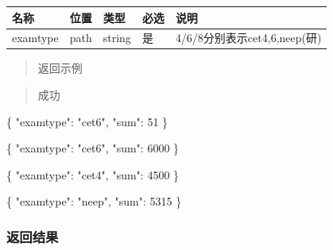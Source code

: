 \documentclass[
]{article}
\newenvironment{Shaded}{}{}
\newcommand{\DataTypeTok}[1]{\textcolor[rgb]{0.56,0.13,0.00}{#1}}
\newcommand{\DecValTok}[1]{\textcolor[rgb]{0.25,0.63,0.44}{#1}}
\newcommand{\FunctionTok}[1]{\textcolor[rgb]{0.02,0.16,0.49}{#1}}
\newcommand{\StringTok}[1]{\textcolor[rgb]{0.25,0.44,0.63}{#1}}
\begin{document}
\begin{longtable}[]{@{}lllll@{}}
\toprule
名称 & 位置 & 类型 & 必选 & 说明 \\
\midrule
\endhead
examtype & path & string & 是 & 4/6/8分别表示cet4,6,neep(研) \\
\bottomrule
\end{longtable}

\begin{quote}
返回示例
\end{quote}

\begin{quote}
成功
\end{quote}

\begin{Shaded}
\begin{Highlighting}[]
\FunctionTok{\{}
  \DataTypeTok{"examtype"}\FunctionTok{:} \StringTok{"cet6"}\FunctionTok{,}
  \DataTypeTok{"sum"}\FunctionTok{:} \DecValTok{51}
\FunctionTok{\}}
\end{Highlighting}
\end{Shaded}

\begin{Shaded}
\begin{Highlighting}[]
\FunctionTok{\{}
  \DataTypeTok{"examtype"}\FunctionTok{:} \StringTok{"cet6"}\FunctionTok{,}
  \DataTypeTok{"sum"}\FunctionTok{:} \DecValTok{6000}
\FunctionTok{\}}
\end{Highlighting}
\end{Shaded}

\begin{Shaded}
\begin{Highlighting}[]
\FunctionTok{\{}
  \DataTypeTok{"examtype"}\FunctionTok{:} \StringTok{"cet4"}\FunctionTok{,}
  \DataTypeTok{"sum"}\FunctionTok{:} \DecValTok{4500}
\FunctionTok{\}}
\end{Highlighting}
\end{Shaded}

\begin{Shaded}
\begin{Highlighting}[]
\FunctionTok{\{}
  \DataTypeTok{"examtype"}\FunctionTok{:} \StringTok{"neep"}\FunctionTok{,}
  \DataTypeTok{"sum"}\FunctionTok{:} \DecValTok{5315}
\FunctionTok{\}}
\end{Highlighting}
\end{Shaded}

\hypertarget{ux8fd4ux56deux7ed3ux679c-7}{%
\subsubsection{返回结果}\label{ux8fd4ux56deux7ed3ux679c-7}}
\end{document}

